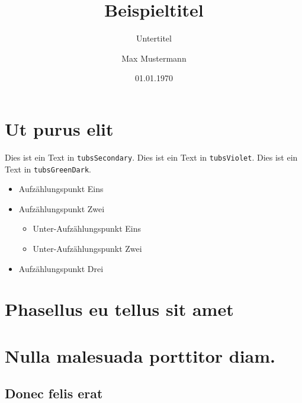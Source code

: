 \documentclass[%
  a4paper,%
  11pt,%
  blue,%
  ]{tubsreprt}
\title{Beispieltitel}
\subtitle{Untertitel}
\author{Max Mustermann}
\date{01.01.1970}
\begin{document}
\maketitle[image,logo=right]%
\makebackpage[trisec]%

\tableofcontents


\chapter{Ut purus elit}

\textcolor{tubsSecondary}{Dies ist ein Text in \texttt{tubsSecondary}.}
\textcolor{tubsViolet}{Dies ist ein Text in \texttt{tubsViolet}.}
\textcolor{tubsGreenDark}{Dies ist ein Text in \texttt{tubsGreenDark}.}\bigskip

\lipsum[1]

\begin{itemize}
  \item Aufzählungspunkt Eins
  \item Aufzählungspunkt Zwei
    \begin{itemize}
      \item Unter-Aufzählungspunkt Eins
      \item Unter-Aufzählungspunkt Zwei
    \end{itemize}
  \item Aufzählungspunkt Drei
\end{itemize}

\chapter{Phasellus eu tellus sit amet}

\lipsum[2-5]

\chapter{Nulla malesuada porttitor diam.}

\lipsum[1-3]

\section{Donec felis erat}

\lipsum[4-7]
\end{document}
